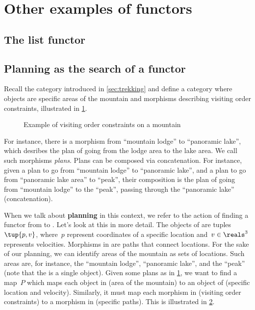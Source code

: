 \section{Other examples of functors}

\subsection{The list functor}


\subsection{Planning as the search of a functor}
\begin{example}
  Recall the category \Berg introduced in \cref{sec:trekking} and define a category \Plans where objects are specific areas of the mountain and morphisms describing visiting order constraints, illustrated in \cref{fig:visiting_order_constraints}.
  \begin{figure}[h!]
    \begin{center}
    \end{center}
    \caption{Example of visiting order constraints on a mountain}
    \label{fig:visiting_order_constraints}
  \end{figure}
  For instance, there is a morphism from ``mountain lodge'' to ``panoramic lake'', which desribes the plan of going from the lodge area to the lake area. We call such morphisms \emph{plans}. Plans can be composed via concatenation. For instance, given a plan to go from ``mountain lodge'' to ``panoramic lake'', and a plan to go from ``panoramic lake area'' to ``peak'', their composition is the plan of going from ``mountain lodge'' to the ``peak'', passing through the ``panoramic lake'' (concatenation).

When we talk about \textbf{planning} in this context, we refer to the action of finding a functor from \Plans to \Berg. Let's look at this in more detail. The objects of \Berg are tuples~$\tup{p,v}$, where~$p$ represent coordinates of a specific location and~$v\in \reals^3$ represents velocities. Morphisms in \Berg are paths that connect locations. For the sake of our planning, we can identify areas of the mountain as sets of locations. Such areas are, for instance, the ``mountain lodge'', ``panoramic lake'', and the 
``peak'' (note that the  is a single object). Given some plans as in \cref{fig:visiting_order_constraints}, we want to find a map~$P$ which maps each object in \Plans (area of the mountain) to an object of \Berg (specific location and velocity). Similarly, it must map each morphism in \Plans (visiting order constraints) to a morphism in \Berg (specific paths). This is illustrated in \cref{fig:plans_functor}.
\end{example}

\begin{figure}
  \centering
  \caption{}
  \label{fig:plans_functor}
\end{figure}

